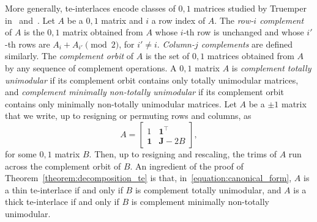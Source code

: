 \documentclass[11pt,a4paper]{amsart}
\theoremstyle{plain}
\newtheorem{corollary}[theorem]{Corollary}
\theoremstyle{definition}
\begin{document}
	More generally, te-interlaces encode classes of $0,\!1$ matrices studied by Truemper in~\cite{Truemper_1980} and~\cite{Truemper_1992}.
	Let $A$ be a $0,\!1$ matrix and $i$ a row index of $A$.
	The \emph{row-$i$ complement} of $A$ is the $0,\!1$ matrix obtained from $A$ whose $i$-th row is unchanged and whose $i'$-th rows are $A_i+A_{i'}\pmod{2}$, for $i'\neq i$.
	\emph{Column-$j$ complements} are defined similarly.
	The \emph{complement orbit} of $A$ is the set of $0,\!1$ matrices obtained from $A$ by any sequence of complement operations.
	A $0,\!1$ matrix $A$ is \emph{complement totally unimodular} if its complement orbit contains only totally unimodular matrices, and \emph{complement minimally non-totally unimodular} if its complement orbit contains only minimally non-totally unimodular matrices.
	Let $A$ be a $\pm1$ matrix that we write, up to resigning or permuting rows and columns, as
	\begin{equation}\label{equation:canonical_form}
		A=\begin{bmatrix}
			1 & \mathbf{1}^\top \\
			\mathbf{1} & \mathbf{J}-2B
		\end{bmatrix},
	\end{equation}
	for some $0,\!1$ matrix $B$.
	Then, up to resigning and rescaling, the trims of $A$ run across the complement orbit of $B$.
	An ingredient of the proof of Theorem~\ref{theorem:decomposition_te} is that, in~\eqref{equation:canonical_form}, $A$ is a thin te-interlace if and only if $B$ is complement totally unimodular, and $A$ is a thick te-interlace if and only if $B$ is complement minimally non-totally unimodular.
	
	
	
\end{document}
